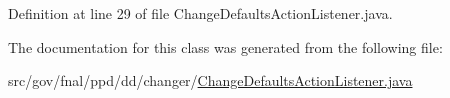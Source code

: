 Definition at line 29 of file Change\-Defaults\-Action\-Listener.\-java.



The documentation for this class was generated from the following file\-:\begin{DoxyCompactItemize}
\item 
src/gov/fnal/ppd/dd/changer/\hyperlink{ChangeDefaultsActionListener_8java}{Change\-Defaults\-Action\-Listener.\-java}\end{DoxyCompactItemize}
